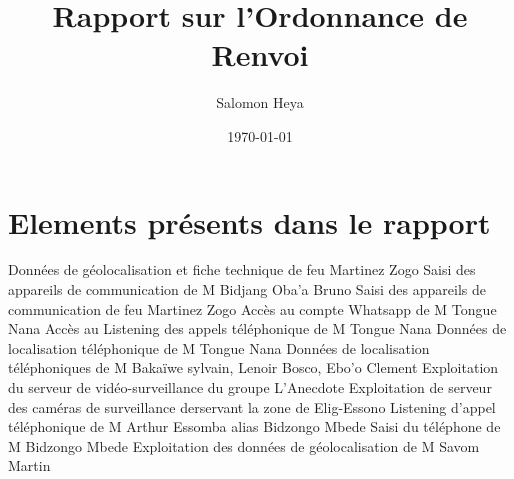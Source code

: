 \documentclass[french]{article}
\author{Salomon Heya}
\date{\today}
\title{Rapport sur l'Ordonnance de Renvoi}
\begin{document}
\section{Elements présents dans le rapport}

Données de géolocalisation et fiche technique de feu Martinez Zogo\newline
Saisi des appareils de communication de M Bidjang Oba'a Bruno\newline
Saisi des appareils de communication de feu Martinez Zogo\newline
Accès au compte Whatsapp de M Tongue Nana\newline
Accès au Listening des appels téléphonique de M Tongue Nana \newline
Données de localisation téléphonique de M Tongue Nana \newline
Données de localisation téléphoniques de M Bakaïwe sylvain, Lenoir Bosco, Ebo'o Clement\newline
Exploitation du serveur de vidéo-surveillance du groupe L'Anecdote \newline
Exploitation de serveur des caméras de surveillance derservant la zone de Elig-Essono\newline
Listening d'appel téléphonique de M Arthur Essomba alias Bidzongo Mbede\newline
Saisi du téléphone de M Bidzongo Mbede\newline
Exploitation des données de géolocalisation de M Savom Martin
\end{document}
